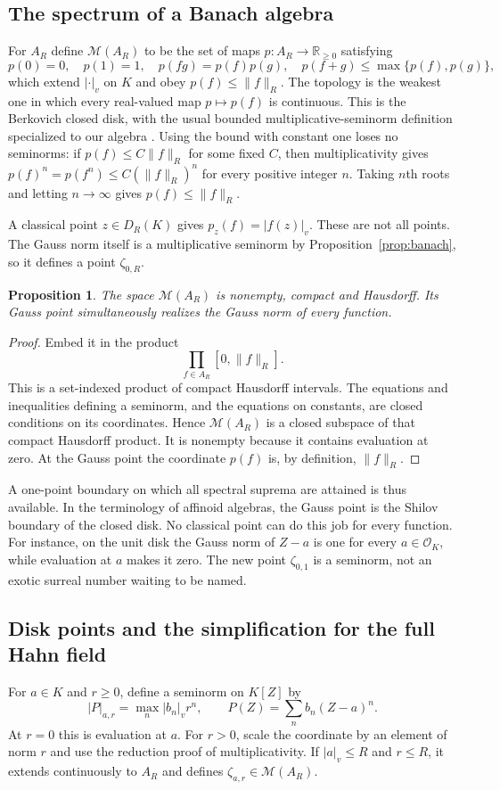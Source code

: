 \documentclass[11pt,a4paper]{article}
\numberwithin{equation}{section}
\newtheorem{proposition}[theorem]{Proposition}
\theoremstyle{definition}
\theoremstyle{remark}
\newcommand{\R}{\mathbb R}
\newcommand{\OO}{\mathcal O}
\newcommand{\abs}[1]{\lvert#1\rvert}
\newcommand{\vabs}[1]{\lvert#1\rvert_v}
\newcommand{\Gauss}[2]{\lVert#1\rVert_{#2}}
\newcommand{\Sp}{\mathcal M}
\begin{document}
\subsection{The spectrum of a Banach algebra}
For $A_R$ define $\Sp(A_R)$ to be the set of maps
$p:A_R\to\R_{\ge0}$ satisfying
\[
 p(0)=0,\quad p(1)=1,\quad p(fg)=p(f)p(g),\quad
 p(f+g)\le\max\{p(f),p(g)\},
\]
which extend $\vabs{\cdot}$ on $K$ and obey $p(f)\le\Gauss fR$.
The topology is the weakest one in which every real-valued map $p\mapsto p(f)$
is continuous. This is the Berkovich closed disk, with the usual bounded
multiplicative-seminorm definition specialized to our algebra
\cite[Definition 2.2.2.1]{Temkin}.
Using the bound with constant one loses no seminorms: if
$p(f)\le C\Gauss fR$ for some fixed $C$, then multiplicativity gives
$p(f)^n=p(f^n)\le C(\Gauss fR)^n$ for every positive integer $n$.
Taking $n$th roots and letting $n\to\infty$ gives $p(f)\le\Gauss fR$.

A classical point $z\in D_R(K)$ gives $p_z(f)=\vabs{f(z)}$. These are not all
points. The Gauss norm itself is a multiplicative seminorm by
Proposition~\ref{prop:banach}, so it defines a point $\zeta_{0,R}$.

\begin{proposition}\label{prop:compact}
The space $\Sp(A_R)$ is nonempty, compact and Hausdorff. Its Gauss point
simultaneously realizes the Gauss norm of every function.
\end{proposition}
\begin{proof}
Embed it in the product
\[
 \prod_{f\in A_R}[0,\Gauss fR].
\]
This is a set-indexed product of compact Hausdorff intervals. The equations and
inequalities defining a seminorm, and the equations on constants, are closed
conditions on its coordinates. Hence $\Sp(A_R)$ is a closed subspace of that
compact Hausdorff product. It is nonempty because it contains evaluation at
zero. At the Gauss point the coordinate $p(f)$ is, by definition, $\Gauss fR$.
\end{proof}

A one-point boundary on which all spectral suprema are attained is thus
available. In the terminology of affinoid algebras, the Gauss point is the
Shilov boundary of the closed disk. No classical point can do this job for every
function. For instance, on the unit disk the Gauss norm of $Z-a$ is one for
every $a\in\OO_K$, while evaluation at $a$ makes it zero. The new point
$\zeta_{0,1}$ is a seminorm, not an exotic surreal number waiting to be named.

\subsection{Disk points and the simplification for the full Hahn field}
For $a\in K$ and $r\ge0$, define a seminorm on $K[Z]$ by
\begin{equation}\label{eq:diskpoint}
 \abs{P}_{a,r}
 =\max_n\vabs{b_n}r^n,
 \qquad P(Z)=\sum_n b_n(Z-a)^n.
\end{equation}
At $r=0$ this is evaluation at $a$. For $r>0$, scale the coordinate by an
 element of norm $r$ and use the reduction proof of multiplicativity. If
$\vabs a\le R$ and $r\le R$, it extends continuously to $A_R$ and defines
$\zeta_{a,r}\in\Sp(A_R)$.
\end{document}
